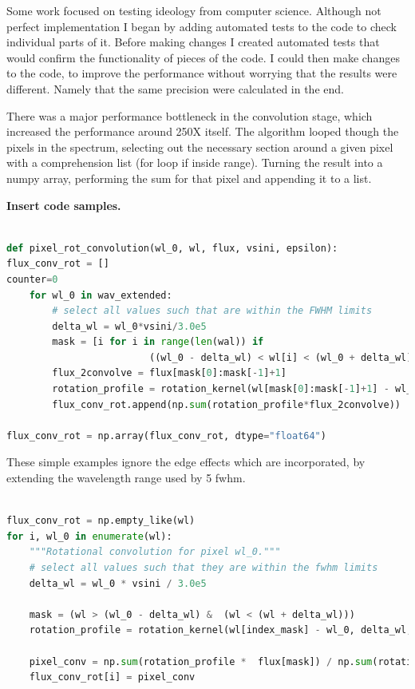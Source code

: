 Some work focused on testing ideology from computer science. Although not perfect implementation I began by adding automated tests to the code to check individual parts of it. 
Before making changes I created automated tests that would confirm the functionality of pieces of the code. I could then make changes to the code, to improve the performance without worrying that the results were different.
Namely that the same precision were calculated in the end.

There was a major performance bottleneck in the convolution stage, which increased the performance around 250X itself. The algorithm looped though the pixels in the spectrum, selecting out the necessary section around a given pixel with a comprehension list (for loop if inside range). Turning the result into a numpy array, performing the sum for that pixel and appending it to a list. 

\textbf{Insert code samples.}

\begin{lstlisting}[language=Python, caption=Python example old]

def pixel_rot_convolution(wl_0, wl, flux, vsini, epsilon):
flux_conv_rot = []
counter=0
    for wl_0 in wav_extended:
        # select all values such that are within the FWHM limits
        delta_wl = wl_0*vsini/3.0e5
        mask = [i for i in range(len(wal)) if
                         ((wl_0 - delta_wl) < wl[i] < (wl_0 + delta_wl))]
        flux_2convolve = flux[mask[0]:mask[-1]+1]
        rotation_profile = rotation_kernel(wl[mask[0]:mask[-1]+1] - wl_0, delta_wl, vsini, epsilon)
        flux_conv_rot.append(np.sum(rotation_profile*flux_2convolve))
 
flux_conv_rot = np.array(flux_conv_rot, dtype="float64")

\end{lstlisting}

These simple examples ignore the edge effects which are incorporated, by extending the wavelength range used by 5 fwhm.
\begin{lstlisting}[language=Python, caption=Python example]

flux_conv_rot = np.empty_like(wl)
for i, wl_0 in enumerate(wl):
    """Rotational convolution for pixel wl_0."""
    # select all values such that they are within the fwhm limits
    delta_wl = wl_0 * vsini / 3.0e5

    mask = (wl > (wl_0 - delta_wl) &  (wl < (wl + delta_wl)))
    rotation_profile = rotation_kernel(wl[index_mask] - wl_0, delta_wl, vsini, epsilon)
    
    pixel_conv = np.sum(rotation_profile *  flux[mask]) / np.sum(rotation_profile)
    flux_conv_rot[i] = pixel_conv

\end{lstlisting}


